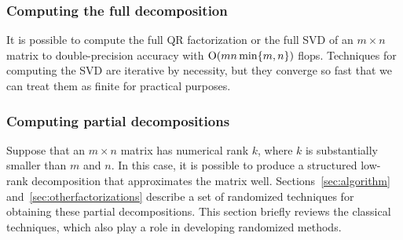 \documentclass[final]{siamltex}
\newcounter{algorithm}[section]
\begin{document}

\subsubsection{Computing the full decomposition}

It is possible to compute the full QR factorization or the full SVD
of an $m \times n$ matrix to double-precision accuracy with
$\mathrm{O}(mn\min\{m,n\})$ flops.  Techniques for computing
the SVD are iterative by necessity, but they converge so fast
that we can treat them as finite for practical purposes.


\subsubsection{Computing partial decompositions}
\label{sec:partial_decomp}

Suppose that an $m \times n$ matrix has numerical rank $k$,
where $k$ is substantially smaller than $m$ and $n$.  In this case,
it is possible to produce a structured low-rank decomposition that
approximates the matrix well.
Sections~\ref{sec:algorithm} and~\ref{sec:otherfactorizations}
describe a set of randomized techniques for obtaining these
partial decompositions.  This section briefly reviews the classical
techniques, which also play a role in developing randomized methods.
\end{document}
